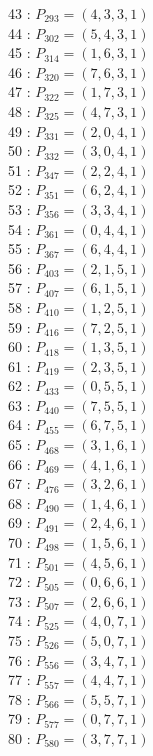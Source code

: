 \documentclass{article}
\begin{document}
{\begin{multicols}{3}
43 : $P_{293}=( 4, 3, 3, 1 )$\\
44 : $P_{302}=( 5, 4, 3, 1 )$\\
45 : $P_{314}=( 1, 6, 3, 1 )$\\
46 : $P_{320}=( 7, 6, 3, 1 )$\\
47 : $P_{322}=( 1, 7, 3, 1 )$\\
48 : $P_{325}=( 4, 7, 3, 1 )$\\
49 : $P_{331}=( 2, 0, 4, 1 )$\\
50 : $P_{332}=( 3, 0, 4, 1 )$\\
51 : $P_{347}=( 2, 2, 4, 1 )$\\
52 : $P_{351}=( 6, 2, 4, 1 )$\\
53 : $P_{356}=( 3, 3, 4, 1 )$\\
54 : $P_{361}=( 0, 4, 4, 1 )$\\
55 : $P_{367}=( 6, 4, 4, 1 )$\\
56 : $P_{403}=( 2, 1, 5, 1 )$\\
57 : $P_{407}=( 6, 1, 5, 1 )$\\
58 : $P_{410}=( 1, 2, 5, 1 )$\\
59 : $P_{416}=( 7, 2, 5, 1 )$\\
60 : $P_{418}=( 1, 3, 5, 1 )$\\
61 : $P_{419}=( 2, 3, 5, 1 )$\\
62 : $P_{433}=( 0, 5, 5, 1 )$\\
63 : $P_{440}=( 7, 5, 5, 1 )$\\
64 : $P_{455}=( 6, 7, 5, 1 )$\\
65 : $P_{468}=( 3, 1, 6, 1 )$\\
66 : $P_{469}=( 4, 1, 6, 1 )$\\
67 : $P_{476}=( 3, 2, 6, 1 )$\\
68 : $P_{490}=( 1, 4, 6, 1 )$\\
69 : $P_{491}=( 2, 4, 6, 1 )$\\
70 : $P_{498}=( 1, 5, 6, 1 )$\\
71 : $P_{501}=( 4, 5, 6, 1 )$\\
72 : $P_{505}=( 0, 6, 6, 1 )$\\
73 : $P_{507}=( 2, 6, 6, 1 )$\\
74 : $P_{525}=( 4, 0, 7, 1 )$\\
75 : $P_{526}=( 5, 0, 7, 1 )$\\
76 : $P_{556}=( 3, 4, 7, 1 )$\\
77 : $P_{557}=( 4, 4, 7, 1 )$\\
78 : $P_{566}=( 5, 5, 7, 1 )$\\
79 : $P_{577}=( 0, 7, 7, 1 )$\\
80 : $P_{580}=( 3, 7, 7, 1 )$\\
\end{multicols}


}
\end{document}
